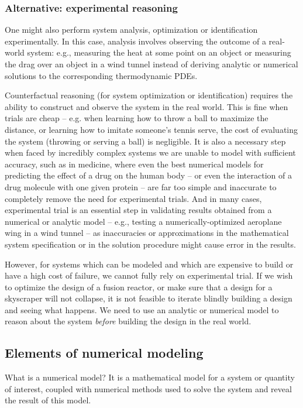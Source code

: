 \documentclass{puthesis}
\begin{document}
\subsubsection{Alternative: experimental reasoning}
One might also perform system analysis, optimization or identification experimentally.
In this case, analysis involves observing the outcome of a real-world system:
e.g., measuring the heat at some point on an object or measuring the drag over an
object in a wind tunnel instead of deriving analytic or numerical solutions to the
corresponding thermodynamic PDEs.

Counterfactual reasoning (for system optimization or identification) requires the
ability to construct and observe the system in the real world.
This is fine when trials are cheap -- e.g. when learning how to throw a ball to
maximize the distance, or learning how to imitate someone's tennis serve, the
cost of evaluating the system (throwing or serving a ball) is negligible.
It is also a necessary step when faced by incredibly complex systems we are unable to model
with sufficient accuracy, such as in medicine, where even the best numerical models
for predicting the effect of a drug on the human body -- or even the interaction of
a drug molecule with one given protein -- are far too simple and inaccurate
to completely remove the need for experimental trials.
And in many cases, experimental trial is an essential step in validating results
obtained from a numerical or analytic model -- e.g., testing a numerically-optimized aeroplane wing in a wind tunnel -- as inaccuracies or approximations in the
mathematical system specification or in the solution procedure might cause error in
the results.

However, for systems which can be modeled and which are expensive to build or have a
high cost of failure, we cannot fully rely on experimental trial.
If we wish to optimize the design of a fusion reactor,
or make sure that a design for a skyscraper will not collapse, it is not feasible to
iterate blindly building a design and seeing what happens.
We need to use an analytic or numerical model to reason about the system
\emph{before} building the design in the real world.


\subsection{Elements of numerical modeling}
What is a numerical model? It is a mathematical model for a system or quantity of
interest, coupled with numerical methods used to solve the system and reveal the result
of this model.
\end{document}
